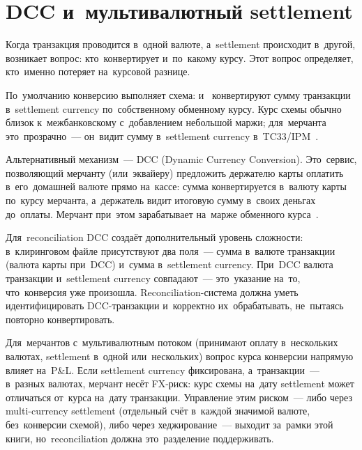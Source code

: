 

\section{DCC и~мультивалютный settlement}
\label{sec:recon-dcc}

Когда транзакция проводится в~одной валюте, а~settlement происходит
в~другой, возникает вопрос: кто~конвертирует и~по~какому курсу. Этот
вопрос определяет, кто~именно потеряет на~курсовой разнице.

По~умолчанию конверсию выполняет схема: 
и~ конвертируют сумму транзакции в~settlement currency
по~собственному обменному курсу. Курс схемы обычно близок к~межбанковскому
с~добавлением небольшой маржи; для~мерчанта это~прозрачно~--- он~видит
сумму в~settlement currency в~TC33/IPM~.

Альтернативный механизм~--- DCC (Dynamic Currency Conversion). Это~сервис, позволяющий
мерчанту (или~эквайеру) предложить держателю карты оплатить в~его~домашней
валюте прямо на~кассе: сумма конвертируется в~валюту карты по~курсу
мерчанта, а~держатель видит итоговую сумму в~своих деньгах до~оплаты.
Мерчант при~этом зарабатывает на~марже обменного курса~.

Для~reconciliation DCC создаёт дополнительный уровень сложности: в~клиринговом
файле присутствуют два поля~--- сумма в~валюте транзакции (валюта карты
при~DCC) и~сумма в~settlement currency. При~DCC валюта транзакции и~settlement
currency совпадают~--- это~указание на~то, что~конверсия уже произошла.
Reconciliation-система должна уметь идентифицировать DCC-транзакции
и~корректно их~обрабатывать, не~пытаясь повторно конвертировать.

Для~мерчантов с~мультивалютным потоком (принимают оплату в~нескольких
валютах, settlement в~одной или~нескольких) вопрос курса конверсии
напрямую влияет на~P\&L. Если settlement currency фиксирована, а~транзакции~---
в~разных валютах, мерчант несёт FX-риск: курс схемы на~дату settlement
может отличаться от~курса на~дату транзакции. Управление этим риском~---
либо через multi-currency settlement (отдельный счёт в~каждой значимой
валюте, без~конверсии схемой), либо через хеджирование~--- выходит
за~рамки этой книги, но~reconciliation должна это~разделение
поддерживать.


